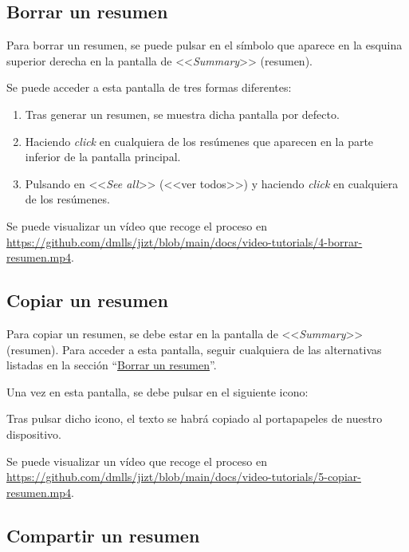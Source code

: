 \subsection{Borrar un resumen} \label{subsection:borrar}

Para borrar un resumen, se puede pulsar en el símbolo que aparece en la esquina superior derecha en la pantalla de <<\emph{Summary}>> (resumen).

Se puede acceder a esta pantalla de tres formas diferentes:

\begin{enumerate}
	\item Tras generar un resumen, se muestra dicha pantalla por defecto.
	
	\item Haciendo \emph{click} en cualquiera de los resúmenes que aparecen en la parte inferior de la pantalla principal.
	
	\item Pulsando en <<\emph{See all}>> (<<ver todos>>) y haciendo \emph{click} en cualquiera de los resúmenes.
\end{enumerate}

Se puede visualizar un vídeo que recoge el proceso en \href{https://github.com/dmlls/jizt/blob/main/docs/video-tutorials/4-borrar-resumen.mp4}{https://github.com/\newline dmlls/jizt/blob/main/docs/video-tutorials/4-borrar-resumen.mp4}.

\subsection{Copiar un resumen}

Para copiar un resumen, se debe estar en la pantalla de <<\emph{Summary}>> (resumen). Para acceder a esta pantalla, seguir cualquiera de las alternativas listadas en la sección ``\hyperref[subsection:borrar]{Borrar un resumen}''.

Una vez en esta pantalla, se debe pulsar en el siguiente icono:

Tras pulsar dicho icono, el texto se habrá copiado al portapapeles de nuestro dispositivo.

Se puede visualizar un vídeo que recoge el proceso en \href{https://github.com/dmlls/jizt/blob/main/docs/video-tutorials/5-copiar-resumen.mp4}{https://github.com/\newline dmlls/jizt/blob/main/docs/video-tutorials/5-copiar-resumen.mp4}.

\subsection{Compartir un resumen}

